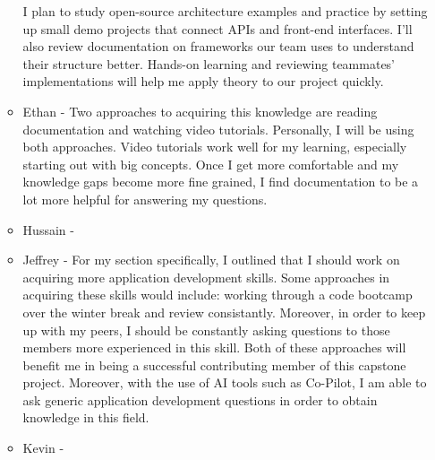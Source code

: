 \begin{enumerate}
\begin{itemize}
        I plan to study open-source architecture examples and practice by setting 
        up small demo projects that connect APIs and front-end interfaces. I’ll also 
        review documentation on frameworks our team uses to understand their structure 
        better. Hands-on learning and reviewing teammates’ implementations will help 
        me apply theory to our project quickly.
        \item Ethan - Two approaches to acquiring this knowledge are reading
          documentation and watching video tutorials. Personally, I will be
          using both approaches. Video tutorials work well for my learning,
          especially starting out with big concepts. Once I get more
          comfortable and my knowledge gaps become more fine grained, I find
          documentation to be a lot more helpful for answering my questions.
        \item Hussain - 
        \item Jeffrey - For my section specifically, I outlined that I should
        work on acquiring more application development skills. Some approaches
        in acquiring these skills would include: working through a code
        bootcamp over the winter break and review consistantly. Moreover,
        in order to keep up with my peers, I should be constantly asking
        questions to those members more experienced in this skill. Both
        of these approaches will benefit me in being a successful 
        contributing member of this capstone project. Moreover, with 
        the use of AI tools such as Co-Pilot, I am able to ask generic
        application development questions in order to obtain knowledge
        in this field.
        \item Kevin - 
  \end{itemize} 
\end{enumerate}

